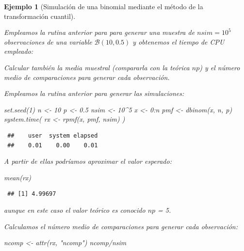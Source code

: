 \documentclass[
]{book}
\newenvironment{Shaded}{\begin{snugshade}}{\end{snugshade}}
\newcommand{\DecValTok}[1]{\textcolor[rgb]{0.00,0.00,0.81}{#1}}
\newcommand{\FloatTok}[1]{\textcolor[rgb]{0.00,0.00,0.81}{#1}}
\newcommand{\FunctionTok}[1]{\textcolor[rgb]{0.00,0.00,0.00}{#1}}
\newcommand{\NormalTok}[1]{#1}
\newcommand{\OtherTok}[1]{\textcolor[rgb]{0.56,0.35,0.01}{#1}}
\newcommand{\SpecialCharTok}[1]{\textcolor[rgb]{0.00,0.00,0.00}{#1}}
\newcommand{\StringTok}[1]{\textcolor[rgb]{0.31,0.60,0.02}{#1}}
\theoremstyle{break}
\newtheorem{example}{Ejemplo}[chapter]
\theoremstyle{nonumberplain}
\begin{document}
\begin{example}[Simulación de una binomial mediante el método de la transformación cuantil]
\protect\hypertarget{exm:binom-cuant}{}\label{exm:binom-cuant}

Empleamos la rutina anterior para para generar una muestra de \(nsim=10^{5}\) observaciones de una variable \(\mathcal{B}(10,0.5)\) y obtenemos el tiempo de CPU empleado:

Calcular también la
media muestral (compararla con la teórica \(np\)) y el número
medio de comparaciones para generar cada observación.

Empleamos la rutina anterior para generar las simulaciones:

\begin{Shaded}
\begin{Highlighting}[]
\FunctionTok{set.seed}\NormalTok{(}\DecValTok{1}\NormalTok{)}
\NormalTok{n }\OtherTok{\textless{}{-}} \DecValTok{10}
\NormalTok{p }\OtherTok{\textless{}{-}} \FloatTok{0.5}
\NormalTok{nsim }\OtherTok{\textless{}{-}} \DecValTok{10}\SpecialCharTok{\^{}}\DecValTok{5}
\NormalTok{x }\OtherTok{\textless{}{-}} \DecValTok{0}\SpecialCharTok{:}\NormalTok{n}
\NormalTok{pmf }\OtherTok{\textless{}{-}} \FunctionTok{dbinom}\NormalTok{(x, n, p)}
\FunctionTok{system.time}\NormalTok{( rx }\OtherTok{\textless{}{-}} \FunctionTok{rpmf}\NormalTok{(x, pmf, nsim) )}
\end{Highlighting}
\end{Shaded}

\begin{verbatim}
 ##    user  system elapsed 
 ##    0.01    0.00    0.01
\end{verbatim}

A partir de ellas podríamos aproximar el valor esperado:

\begin{Shaded}
\begin{Highlighting}[]
\FunctionTok{mean}\NormalTok{(rx)}
\end{Highlighting}
\end{Shaded}

\begin{verbatim}
 ## [1] 4.99697
\end{verbatim}

aunque en este caso el valor teórico es conocido \(np\) = 5.

Calculamos el número medio de comparaciones para generar cada observación:

\begin{Shaded}
\begin{Highlighting}[]
\NormalTok{ncomp }\OtherTok{\textless{}{-}} \FunctionTok{attr}\NormalTok{(rx, }\StringTok{"ncomp"}\NormalTok{)}
\NormalTok{ncomp}\SpecialCharTok{/}\NormalTok{nsim}
\end{Highlighting}
\end{Shaded}


\end{example}
\end{document}
